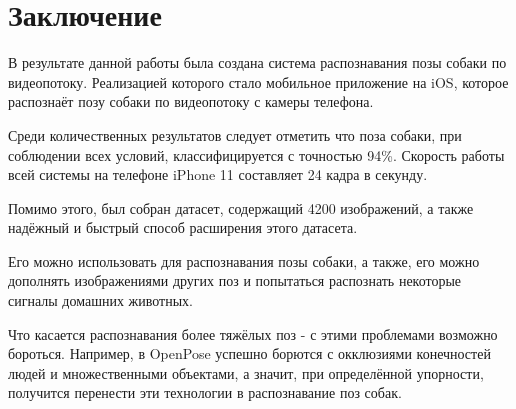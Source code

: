 \chapter*{Заключение}						%


В результате данной работы была создана система распознавания позы собаки по видеопотоку. Реализацией которого стало мобильное приложение на iOS, которое распознаёт позу собаки по видеопотоку с камеры телефона.

Среди количественных результатов следует отметить что поза собаки, при соблюдении всех условий, классифицируется с точностью 94\%. Скорость работы всей системы на телефоне iPhone 11 составляет 24 кадра в секунду.

Помимо этого, был собран датасет, содержащий 4200 изображений, а также надёжный и быстрый способ расширения этого датасета.

Его можно использовать для распознавания позы собаки, а также, его можно дополнять изображениями других поз и попытаться распознать некоторые сигналы домашних животных.

Что касается распознавания более тяжёлых поз - с этими проблемами возможно бороться. Например, в OpenPose\cite{openpose} успешно борются с окклюзиями конечностей людей и множественными объектами, а значит, при определённой упорности, получится перенести эти технологии в распознавание поз собак.